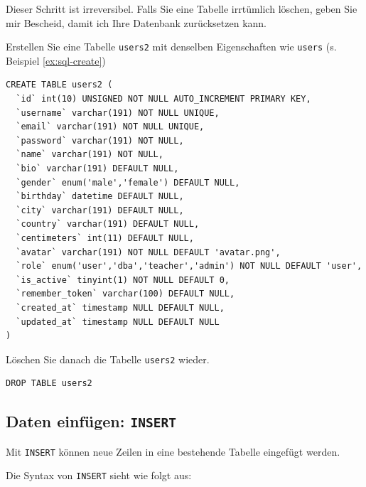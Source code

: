 \begin{mycaution}
  Dieser Schritt ist irreversibel. Falls Sie eine Tabelle irrtümlich löschen, geben Sie mir Bescheid, damit ich Ihre Datenbank zurücksetzen kann.
\end{mycaution}

\begin{myexercise}\label{aufg:a-sql-insert}
  Erstellen Sie eine Tabelle \texttt{users2} mit denselben Eigenschaften wie \texttt{users} (s. Beispiel \ref{ex:sql-create})
  \begin{myanswer}
    \begin{lstlisting}[style=sql]
CREATE TABLE users2 (
  `id` int(10) UNSIGNED NOT NULL AUTO_INCREMENT PRIMARY KEY,
  `username` varchar(191) NOT NULL UNIQUE,
  `email` varchar(191) NOT NULL UNIQUE,
  `password` varchar(191) NOT NULL,
  `name` varchar(191) NOT NULL,
  `bio` varchar(191) DEFAULT NULL,
  `gender` enum('male','female') DEFAULT NULL,
  `birthday` datetime DEFAULT NULL,
  `city` varchar(191) DEFAULT NULL,
  `country` varchar(191) DEFAULT NULL,
  `centimeters` int(11) DEFAULT NULL,
  `avatar` varchar(191) NOT NULL DEFAULT 'avatar.png',
  `role` enum('user','dba','teacher','admin') NOT NULL DEFAULT 'user',
  `is_active` tinyint(1) NOT NULL DEFAULT 0,
  `remember_token` varchar(100) DEFAULT NULL,
  `created_at` timestamp NULL DEFAULT NULL,
  `updated_at` timestamp NULL DEFAULT NULL
)
\end{lstlisting}
  \end{myanswer}
\end{myexercise}

\begin{myexercise}
  Löschen Sie danach die Tabelle \texttt{users2} wieder.
  \begin{myanswer}
    \begin{lstlisting}[style=sql]
DROP TABLE users2
\end{lstlisting}
  \end{myanswer}
\end{myexercise}


\subsection{Daten einfügen: \texorpdfstring{\lstinline[style=sql]|INSERT|}{INSERT}}

Mit \lstinline[style=sql]|INSERT| können neue Zeilen in eine bestehende Tabelle eingefügt werden.

Die Syntax von \lstinline[style=sql]|INSERT| sieht wie folgt aus:

